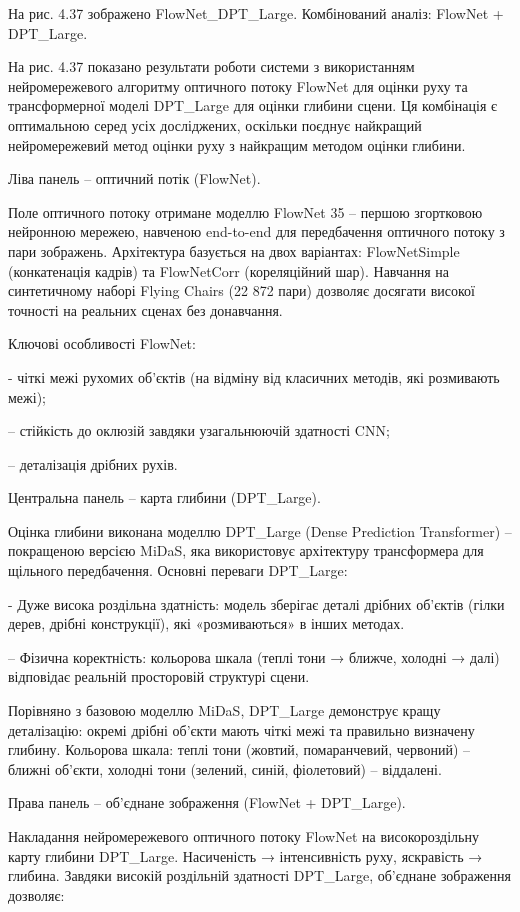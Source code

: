 \documentclass[
]{article}
\begin{document}
На рис. 4.37 зображено FlowNet\_DPT\_Large. Комбінований аналіз: FlowNet + DPT\_Large.

На рис. 4.37 показано результати роботи системи з використанням нейромережевого алгоритму оптичного потоку FlowNet для оцінки руху та трансформерної моделі DPT\_Large для оцінки глибини сцени. Ця комбінація є оптимальною серед усіх досліджених, оскільки поєднує найкращий нейромережевий метод оцінки руху з найкращим методом оцінки глибини.

Ліва панель -- оптичний потік (FlowNet).

Поле оптичного потоку отримане моделлю FlowNet 35 -- першою згортковою нейронною мережею, навченою end-to-end для передбачення оптичного потоку з пари зображень. Архітектура базується на двох варіантах: FlowNetSimple (конкатенація кадрів) та FlowNetCorr (кореляційний шар). Навчання на синтетичному наборі Flying Chairs (22 872 пари) дозволяє досягати високої точності на реальних сценах без донавчання.

Ключові особливості FlowNet:

- чіткі межі рухомих об'єктів (на відміну від класичних методів, які розмивають межі);

-- стійкість до оклюзій завдяки узагальнюючій здатності CNN;

-- деталізація дрібних рухів.

Центральна панель -- карта глибини (DPT\_Large).

Оцінка глибини виконана моделлю DPT\_Large (Dense Prediction Transformer) -- покращеною версією MiDaS, яка використовує архітектуру трансформера для щільного передбачення. Основні переваги DPT\_Large:

- Дуже висока роздільна здатність: модель зберігає деталі дрібних об'єктів (гілки дерев, дрібні конструкції), які «розмиваються» в інших методах.

-- Фізична коректність: кольорова шкала (теплі тони → ближче, холодні → далі) відповідає реальній просторовій структурі сцени.

Порівняно з базовою моделлю MiDaS, DPT\_Large демонструє кращу деталізацію: окремі дрібні об'єкти мають чіткі межі та правильно визначену глибину. Кольорова шкала: теплі тони (жовтий, помаранчевий, червоний) -- ближні об'єкти, холодні тони (зелений, синій, фіолетовий) -- віддалені.

Права панель -- об'єднане зображення (FlowNet + DPT\_Large).

Накладання нейромережевого оптичного потоку FlowNet на високороздільну карту глибини DPT\_Large. Насиченість → інтенсивність руху, яскравість → глибина. Завдяки високій роздільній здатності DPT\_Large, об'єднане зображення дозволяє:
\end{document}
